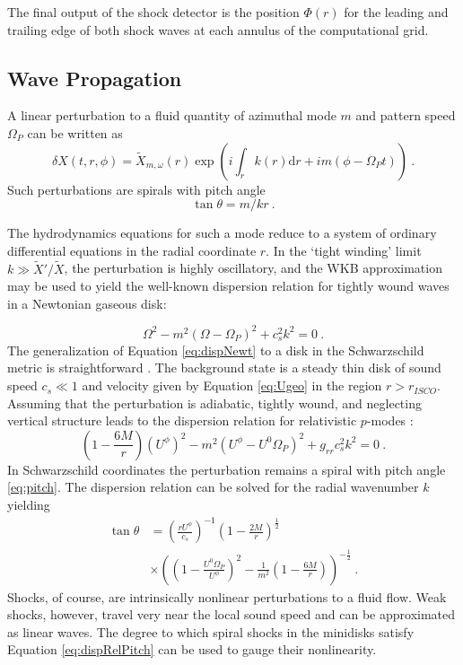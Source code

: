 \documentclass{emulateapj}
\newcommand{\dd}{\mbox{d}}
\begin{document}
The final output of the shock detector is the position $\Phi(r)$ for the leading and trailing edge of both shock waves at each annulus of the computational grid.

\subsection{Wave Propagation}

A linear perturbation to a fluid quantity of azimuthal mode $m$ and pattern speed $\Omega_P$ can be written as
\begin{equation}
	\delta X(t, r, \phi) = \tilde{X}_{m,\omega}(r) \exp \left( i \int_r k(r) \dd r  + i m (\phi - \Omega_P t) \right)\ . \label{eq:pert}
\end{equation}
Such perturbations are spirals with pitch angle
\begin{equation}
	\tan \theta = m / k r \ . \label{eq:pitch}
\end{equation}

The hydrodynamics equations for such a mode reduce to a system of ordinary differential equations in the radial coordinate $r$.  In the `tight winding' limit $k \gg \tilde{X}'/\tilde{X}$, the perturbation is highly oscillatory, and the WKB approximation may be used to yield the well-known \citep{Binney08} dispersion relation for tightly wound waves in a Newtonian gaseous disk:

\begin{equation}
	\Omega^2 - m^2(\Omega-\Omega_P)^2 + c_s^2 k^2 = 0 \ . \label{eq:dispNewt}
\end{equation}
The generalization of Equation \eqref{eq:dispNewt} to a disk in the Schwarzschild metric is straightforward \citep{Perez97}.  The background state is a steady thin disk of sound speed $c_s \ll 1$ and velocity given by Equation \eqref{eq:Ugeo} in the region $r > r_{ISCO}$.  Assuming that the perturbation is adiabatic, tightly wound, and neglecting vertical structure leads to the dispersion relation for relativistic $p$-modes \citep{Abramowicz13}:
\begin{equation}
	\left(1-\frac{6M}{r} \right)\left(U^\phi\right)^2 - m^2(U^\phi-U^0\Omega_P)^2 + g_{rr} c_s^2 k^2 = 0 \ . \label{eq:disprel}
\end{equation}
In Schwarzschild coordinates the perturbation remains a spiral with pitch angle \eqref{eq:pitch}.  The dispersion relation can be solved for the radial wavenumber $k$ yielding
\begin{align}
	\tan \theta &= \left( \frac{r U^\phi}{c_s} \right)^{-1} \left(1-\frac{2M}{r}\right)^{\frac{1}{2}} \label{eq:dispRelPitch} \\ \nonumber
		&\times \left(\left(1- \frac{U^0 \Omega_P}{U^\phi}\right)^2 - \frac{1}{m^2}\left(1-\frac{6M}{r}\right)\right)^{-\frac{1}{2}}\ . 
\end{align}
Shocks, of course, are intrinsically nonlinear perturbations to a fluid flow.  Weak shocks, however, travel very near the local sound speed and can be approximated as linear waves.  The degree to which spiral shocks in the minidisks satisfy Equation \eqref{eq:dispRelPitch} can be used to gauge their nonlinearity.  
\end{document}
